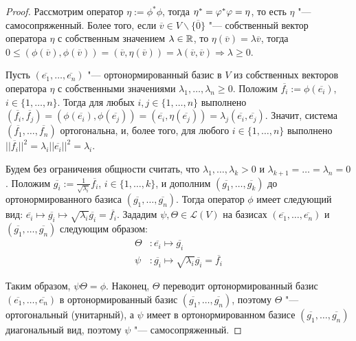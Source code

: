 \begin{proof}
	Рассмотрим оператор $\eta := \phi^*\phi$, тогда $\eta^* = \phi^*\phi \hm{=} \eta$, то есть $\eta$ "--- самосопряженный. Более того, если $\overline{v} \in V \backslash \{\overline{0}\}$ "--- собственный вектор оператора $\eta$ с собственным значением $\lambda \in \mathbb{R}$, то $\eta(\overline{v}) = \lambda\overline{v}$, тогда $0 \le (\phi(\overline{v}), \phi(\overline{v})) = (\overline{v}, \eta(\overline{v})) = \lambda(\overline{v}, \overline{v}) \Rightarrow \lambda \ge 0$.
	
	Пусть $(\overline{e_1}, \dots, \overline{e_n})$ "--- ортонормированный базис в $V$ из собственных векторов оператора $\eta$ с собственными значениями $\lambda_1, \dotsc, \lambda_n \ge 0$. Положим $\overline{f_i} := \phi(\overline{e_i})$, $i \in \{1, \dotsc, n\}$. Тогда для любых $i, j \in \{1, \dots, n\}$ выполнено $(\overline{f_i}, \overline{f_j}) = (\phi(\overline{e_i}), \phi(\overline{e_j})) = (\overline{e_i}, \eta(\overline{e_j})) = \lambda_j(\overline{e_i}, \overline{e_j})$. Значит, система $(\overline{f_1}, \dots, \overline{f_n})$ ортогональна, и, более того, для любого $i \in \{1, \dotsc, n\}$ выполнено $||\overline{f_i}||^2 = \lambda_i||\overline{e_i}||^2 = \lambda_i$.
	
	Будем без ограничения общности считать, что $\lambda_1, \dots, \lambda_k > 0$ и $\lambda_{k + 1} = \dots = \lambda_n = 0$. Положим $\overline{g_i} := \frac{1}{\sqrt{\lambda_i}}\overline{f_i}$, $i \in \{1, \dots, k\}$, и дополним $(\overline{g_1}, \dots, \overline{g_k})$ до ортонормированного базиса $(\overline{g_1}, \dots, \overline{g_n})$. Тогда оператор $\phi$ имеет следующий вид:
	$\overline{e_i} \mapsto \overline{g_i} \mapsto \sqrt{\lambda_{i}}\overline{g_i} = \overline{f_i}$. Зададим $\psi, \Theta \in \mathcal{L}(V)$ на базисах $(\overline{e_1}, \dots, \overline{e_n})$ и $(\overline{g_1}, \dots, \overline{g_n})$ следующим образом:
	\begin{align*}
		\Theta&: \overline{e_i} \mapsto \overline{g_i}\\
		\psi&: \overline{g_i} \mapsto \sqrt{\lambda_{i}}\overline{g_i} = \overline{f_i}
	\end{align*}
	
	Таким образом, $\psi\Theta = \phi$. Наконец, $\Theta$ переводит ортонормированный базис $(\overline{e_1}, \dots, \overline{e_n})$ в ортонормированный базис $(\overline{g_1}, \dots, \overline{g_n})$, поэтому $\Theta$ "--- ортогональный (унитарный), а $\psi$ имеет в ортонормированном базисе $(\overline{g_1}, \dots, \overline{g_n})$ диагональный вид, поэтому $\psi$ "--- самосопряженный.
\end{proof}

